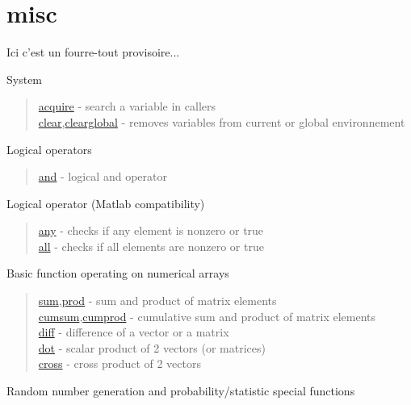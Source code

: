 \chapter*{misc}

Ici c'est un fourre-tout provisoire... 

System

\begin{quote}
\noindent
\hyperlink{acquire}{acquire} - search a variable in callers  \\
\hyperlink{clear}{clear},\hyperlink{clearglobal}{clearglobal} - removes variables from current or global environnement  \\
\end{quote}

Logical operators
\begin{quote}
\noindent
\hyperlink{and}{and} - logical and operator \\
\end{quote}

Logical operator (Matlab compatibility)

\begin{quote}
\noindent
\hyperlink{any}{any} - checks if any element is nonzero or true  \\
\hyperlink{all}{all} - checks if all elements are nonzero or true \\
\end{quote}

Basic function operating on numerical arrays
\begin{quote}
\noindent
\hyperlink{sum}{sum},\hyperlink{prod}{prod} - sum and product of matrix elements \\
\hyperlink{cumsum}{cumsum},\hyperlink{cumprod}{cumprod} - cumulative sum and product of matrix elements \\
\hyperlink{diff}{diff} - difference of a vector or a matrix \\
\hyperlink{dot}{dot} - scalar product of 2 vectors (or matrices) \\
\hyperlink{cross}{cross} - cross product of 2 vectors \\
\end{quote}
 

Random number generation and probability/statistic special functions


